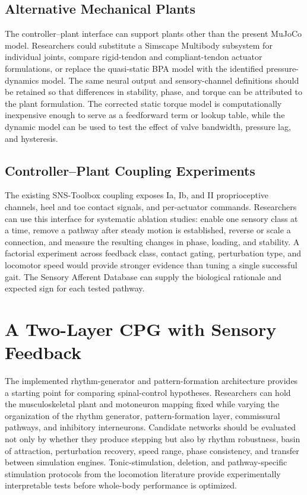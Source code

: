 \subsection{Alternative Mechanical Plants}

\begin{reviewchange}
The controller--plant interface can support plants other than the present MuJoCo model. Researchers could substitute a Simscape Multibody subsystem for individual joints, compare rigid-tendon and compliant-tendon actuator formulations, or replace the quasi-static BPA model with the identified pressure-dynamics model. The same neural output and sensory-channel definitions should be retained so that differences in stability, phase, and torque can be attributed to the plant formulation. The corrected static torque model is computationally inexpensive enough to serve as a feedforward term or lookup table, while the dynamic model can be used to test the effect of valve bandwidth, pressure lag, and hysteresis.
\end{reviewchange}

\subsection{Controller--Plant Coupling Experiments}

\begin{reviewchange}
The existing SNS-Toolbox coupling exposes Ia, Ib, and II proprioceptive channels, heel and toe contact signals, and per-actuator commands. Researchers can use this interface for systematic ablation studies: enable one sensory class at a time, remove a pathway after steady motion is established, reverse or scale a connection, and measure the resulting changes in phase, loading, and stability. A factorial experiment across feedback class, contact gating, perturbation type, and locomotor speed would provide stronger evidence than tuning a single successful gait. The Sensory Afferent Database can supply the biological rationale and expected sign for each tested pathway.
\end{reviewchange}

\section{A Two-Layer CPG with Sensory Feedback}\label{sec:fw_cpg}

\begin{reviewchange}
The implemented rhythm-generator and pattern-formation architecture provides a starting point for comparing spinal-control hypotheses. Researchers can hold the musculoskeletal plant and motoneuron mapping fixed while varying the organization of the rhythm generator, pattern-formation layer, commissural pathways, and inhibitory interneurons. Candidate networks should be evaluated not only by whether they produce stepping but also by rhythm robustness, basin of attraction, perturbation recovery, speed range, phase consistency, and transfer between simulation engines. Tonic-stimulation, deletion, and pathway-specific stimulation protocols from the locomotion literature provide experimentally interpretable tests before whole-body performance is optimized.
\end{reviewchange}

